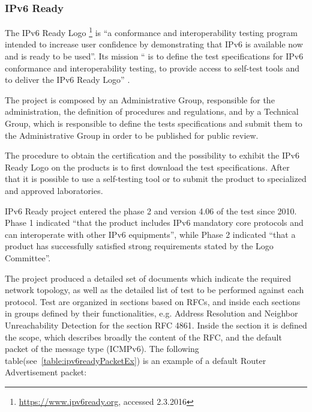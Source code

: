 \documentclass[12pt]{article}
\begin{document}
\subsubsection{IPv6 Ready}
\label{subsub:ipv6Ready}

The IPv6 Ready Logo \footnote{\url{https://www.ipv6ready.org}, accessed 2.3.2016} is ``a conformance and interoperability testing program intended to increase user confidence by demonstrating that IPv6 is available now and is ready to be used''. Its mission `` is to define the test specifications for IPv6 conformance and interoperability testing, to provide access to self-test tools and to deliver the IPv6 Ready Logo'' \cite{ipv6ready}.

The project is composed by an Administrative Group, responsible for the administration, the definition of procedures and regulations, and by a Technical Group, which is responsible to define the tests specifications and submit them to the Administrative Group in order to be published for public review.

The procedure to obtain the certification and the possibility to exhibit the IPv6 Ready Logo on the products is to first download the test specifications. After that it is possible to use a self-testing tool or to submit the product to specialized and approved laboratories.

IPv6 Ready project entered the phase 2 and version 4.06 of the test since 2010. Phase 1 indicated ``that the product includes IPv6 mandatory core protocols and can interoperate with other IPv6 equipments'', while Phase 2 indicated ``that a product has successfully satisfied strong requirements stated by the Logo Committee''.

The project produced a detailed set of documents\cite{ipv6readyCore}\cite{ipv6readyCore2} which indicate the required network topology, as well as the detailed list of test to be performed against each protocol. Test are organized in sections based on RFCs, and inside each sections in groups defined by their functionalities, e.g. Address Resolution and Neighbor Unreachability Detection for the section RFC 4861. Inside the section it is defined the scope, which describes broadly the content of the RFC, and the default packet of the message type (ICMPv6). The following table(see~\ref{table:ipv6readyPacketEx}) is an example of a default Router Advertisement packet:
\end{document}
